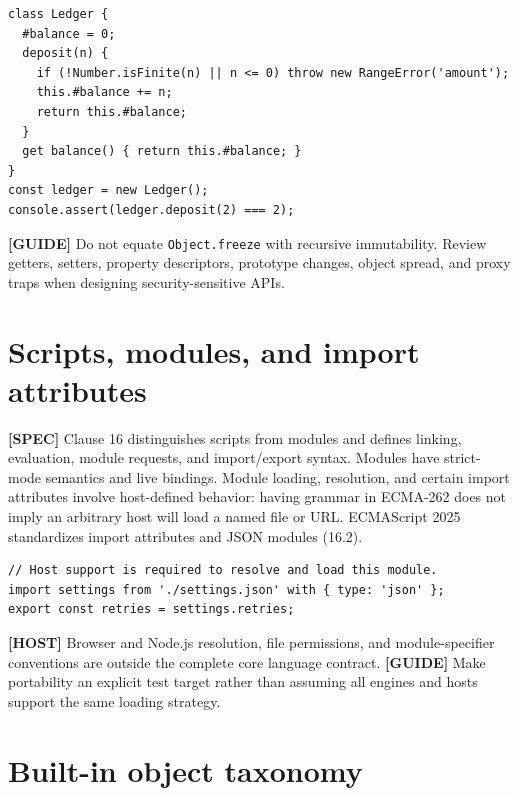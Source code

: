 \documentclass[11pt,letterpaper]{article}
\newcommand{\passthrough}[1]{#1}
\begin{document}
\begin{lstlisting}
class Ledger {
  #balance = 0;
  deposit(n) {
    if (!Number.isFinite(n) || n <= 0) throw new RangeError('amount');
    this.#balance += n;
    return this.#balance;
  }
  get balance() { return this.#balance; }
}
const ledger = new Ledger();
console.assert(ledger.deposit(2) === 2);
\end{lstlisting}

\textbf{{[}GUIDE{]}} Do not equate \passthrough{\lstinline!Object.freeze!} with recursive immutability. Review getters, setters, property descriptors, prototype changes, object spread, and proxy traps when designing security-sensitive APIs.

\section{Scripts, modules, and import attributes}\label{scripts-modules-and-import-attributes}

\textbf{{[}SPEC{]}} Clause 16 distinguishes scripts from modules and defines linking, evaluation, module requests, and import/export syntax. Modules have strict-mode semantics and live bindings. Module loading, resolution, and certain import attributes involve host-defined behavior: having grammar in ECMA-262 does not imply an arbitrary host will load a named file or URL. ECMAScript 2025 standardizes import attributes and JSON modules (16.2).

\begin{lstlisting}
// Host support is required to resolve and load this module.
import settings from './settings.json' with { type: 'json' };
export const retries = settings.retries;
\end{lstlisting}

\textbf{{[}HOST{]}} Browser and Node.js resolution, file permissions, and module-specifier conventions are outside the complete core language contract. \textbf{{[}GUIDE{]}} Make portability an explicit test target rather than assuming all engines and hosts support the same loading strategy.

\section{Built-in object taxonomy}\label{built-in-object-taxonomy}
\end{document}
